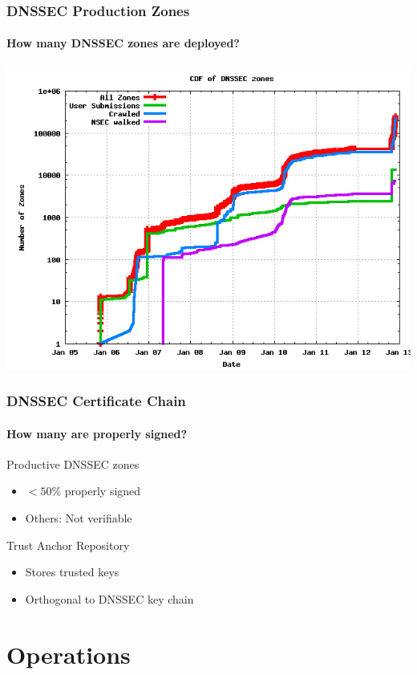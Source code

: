 \documentclass{beamer}
\begin{document}
\begin{frame}
  \frametitle{DNSSEC Production Zones}
  \framesubtitle{How many DNSSEC zones are deployed?}
  \includegraphics[width=.9\textwidth]{dnssec-growth}
\end{frame}

\begin{frame}
  \frametitle{DNSSEC Certificate Chain}
  \framesubtitle{How many are properly signed?}

  \begin{block}{Productive DNSSEC zones}
    \begin{itemize}
    \item $< 50\%$ properly signed
    \item Others: Not verifiable
    \end{itemize}
  \end{block}

  \pause
  
  \begin{block}{Trust Anchor Repository}
    \begin{itemize}
    \item Stores trusted keys
    \item Orthogonal to DNSSEC key chain
    \end{itemize}
  \end{block}

\end{frame}

\section{Operations}
\end{document}
